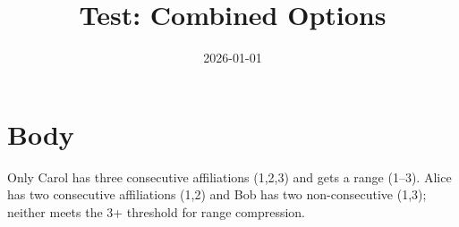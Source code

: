 \documentclass{article}
\title{Test: Combined Options}
\date{2026-01-01}
\begin{document}
\maketitle
\section{Body}
Only Carol has three consecutive affiliations (1,2,3) and gets a range (1--3).
Alice has two consecutive affiliations (1,2) and Bob has two non-consecutive (1,3);
neither meets the 3+ threshold for range compression.
\end{document}
